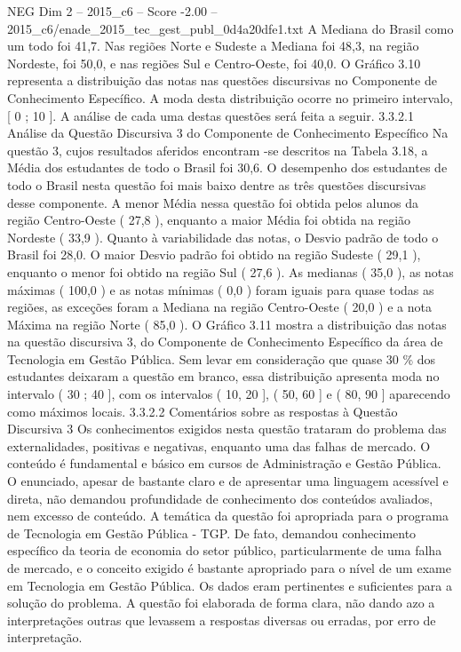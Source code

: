 \begin{textsample}{NEG Dim 2 – 2015\_c6 – Score -2.00 – 2015\_c6/enade\_2015\_tec\_gest\_publ\_0d4a20dfe1.txt}
A Mediana do Brasil como um todo foi 41,7.
Nas regiões Norte e Sudeste a Mediana foi 48,3, na região Nordeste, foi 50,0, e nas regiões Sul e Centro-Oeste, foi 40,0.
O Gráfico 3.10 representa a distribuição das notas nas questões discursivas no Componente de Conhecimento Específico.
A moda desta distribuição ocorre no primeiro intervalo, [ 0 ; 10 ].
A análise de cada uma destas questões será feita a seguir. 3.3.2.1 Análise da Questão Discursiva 3 do Componente de Conhecimento Específico Na questão 3, cujos resultados aferidos encontram -se descritos na Tabela 3.18, a Média dos estudantes de todo o Brasil foi 30,6.
O desempenho dos estudantes de todo o Brasil nesta questão foi mais baixo dentre as três questões discursivas desse componente.
A menor Média nessa questão foi obtida pelos alunos da região Centro-Oeste ( 27,8 ), enquanto a maior Média foi obtida na região Nordeste ( 33,9 ).
Quanto à variabilidade das notas, o Desvio padrão de todo o Brasil foi 28,0.
O maior Desvio padrão foi obtido na região Sudeste ( 29,1 ), enquanto o menor foi obtido na região Sul ( 27,6 ).
As medianas ( 35,0 ), as notas máximas ( 100,0 ) e as notas mínimas ( 0,0 ) foram iguais para quase todas as regiões, as exceções foram a Mediana na região Centro-Oeste ( 20,0 ) e a nota Máxima na região Norte ( 85,0 ).
O Gráfico 3.11 mostra a distribuição das notas na questão discursiva 3, do Componente de Conhecimento Específico da área de Tecnologia em Gestão Pública.
Sem levar em consideração que quase 30 \% dos estudantes deixaram a questão em branco, essa distribuição apresenta moda no intervalo ( 30 ; 40 ], com os intervalos ( 10, 20 ], ( 50, 60 ] e ( 80, 90 ] aparecendo como máximos locais. 3.3.2.2 Comentários sobre as respostas à Questão Discursiva 3 Os conhecimentos exigidos nesta questão trataram do problema das externalidades, positivas e negativas, enquanto uma das falhas de mercado.
O conteúdo é fundamental e básico em cursos de Administração e Gestão Pública.
O enunciado, apesar de bastante claro e de apresentar uma linguagem acessível e direta, não demandou profundidade de conhecimento dos conteúdos avaliados, nem excesso de conteúdo.
A temática da questão foi apropriada para o programa de Tecnologia em Gestão Pública - TGP.
De fato, demandou conhecimento específico da teoria de economia do setor público, particularmente de uma falha de mercado, e o conceito exigido é bastante apropriado para o nível de um exame em Tecnologia em Gestão Pública.
Os dados eram pertinentes e suficientes para a solução do problema.
A questão foi elaborada de forma clara, não dando azo a interpretações outras que levassem a respostas diversas ou erradas, por erro de interpretação.

\end{textsample}
